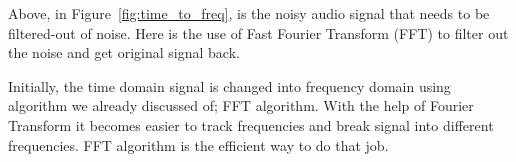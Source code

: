 \documentclass[a4paper, 12pt]{scrartcl}
\begin{document}
Above, in Figure~\ref{fig:time_to_freq}, is the noisy audio signal that needs to be filtered-out of noise.
Here is the use of Fast Fourier Transform (FFT) to filter out the noise and get original signal back.

Initially, the time domain signal is changed into frequency domain using algorithm we already discussed of; FFT algorithm.
With the help of Fourier Transform it becomes easier to track frequencies and break signal into different frequencies.
FFT algorithm is the efficient way to do that job.

\newpage


  
\end{document}
